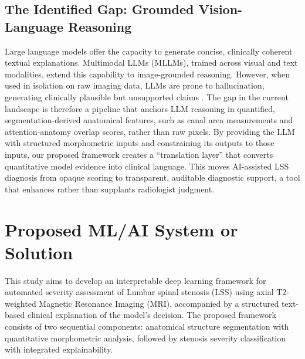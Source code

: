 \documentclass[12pt]{article}
\begin{document}
\subsection{The Identified Gap: Grounded Vision-Language Reasoning}
Large language models offer the capacity to generate concise, clinically coherent textual explanations. Multimodal LLMs (MLLMs), trained across visual and text modalities, extend this capability to image-grounded reasoning. However, when used in isolation on raw imaging data, LLMs are prone to hallucination, generating clinically plausible but unsupported claims \citep{pal2024geminigoesmedschool, Omar2025, Yang2025}. The gap in the current landscape is therefore a pipeline that anchors LLM reasoning in quantified, segmentation-derived anatomical features, such as canal area measurements and attention-anatomy overlap scores, rather than raw pixels. By providing the LLM with structured morphometric inputs and constraining its outputs to those inputs, our proposed framework creates a “translation layer” that converts quantitative model evidence into clinical language. This moves AI-assisted LSS diagnosis from opaque scoring to transparent, auditable diagnostic support, a tool that enhances rather than supplants radiologist judgment.

\section{Proposed ML/AI System or Solution}
This study aims to develop an interpretable deep learning framework for automated severity assessment of Lumbar spinal stenosis (LSS) using axial T2-weighted Magnetic Resonance Imaging (MRI), accompanied by a structured text-based clinical explanation of the model’s decision. The proposed framework consists of two sequential components: anatomical structure segmentation with quantitative morphometric analysis, followed by stenosis severity classification with integrated explainability.
\end{document}

